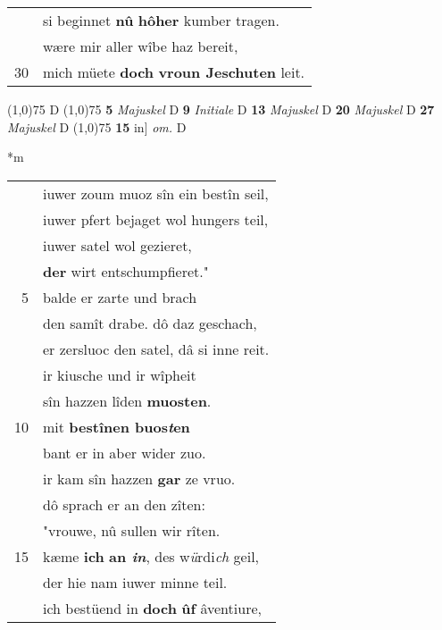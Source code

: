 \documentclass[8pt,a4paper,notitlepage]{article}
\begin{document}
\begin{table}[ht]
\begin{minipage}[t]{0.5\linewidth}
\begin{tabular}{rl}
 & si beginnet \textbf{nû} \textbf{hôher} kumber tragen.\\ 
 & wære mir aller wîbe haz bereit,\\ 
30 & mich müete \textbf{doch} \textbf{vroun Jeschuten} leit.\\ 
\end{tabular}
\scriptsize
\line(1,0){75} \newline
D \newline
\line(1,0){75} \newline
\textbf{5} \textit{Majuskel} D  \textbf{9} \textit{Initiale} D  \textbf{13} \textit{Majuskel} D  \textbf{20} \textit{Majuskel} D  \textbf{27} \textit{Majuskel} D  \newline
\line(1,0){75} \newline
\textbf{15} in] \textit{om.} D \newline
\end{minipage}
\hspace{0.5cm}
\begin{minipage}[t]{0.5\linewidth}
\small
\begin{center}*m
\end{center}
\begin{tabular}{rl}
 & iuwer zoum muoz sîn ein bestîn seil,\\ 
 & iuwer pfert bejaget wol hungers teil,\\ 
 & iuwer satel wol gezieret,\\ 
 & \textbf{der} wirt entschumpfieret."\\ 
5 & balde er zarte und brach\\ 
 & den samît drabe. dô daz geschach,\\ 
 & er zersluoc den satel, dâ si inne reit.\\ 
 & ir kiusche und ir wîpheit\\ 
 & sîn hazzen lîden \textbf{muosten}.\\ 
10 & mit \textbf{bestînen buos\textit{t}en}\\ 
 & bant er in aber wider zuo.\\ 
 & ir kam sîn hazzen \textbf{gar} ze vruo.\\ 
 & dô sprach er an den zîten:\\ 
 & "vrouwe, nû sullen wir rîten.\\ 
15 & kæme \textbf{ich} \textbf{an \textit{in}}, des w\textit{ü}rdi\textit{ch} geil,\\ 
 & der hie nam iuwer minne teil.\\ 
 & ich bestüend in \textbf{doch} \textbf{ûf} âventiure,\\ 

\end{tabular}
\end{minipage}
\end{table}
\end{document}
